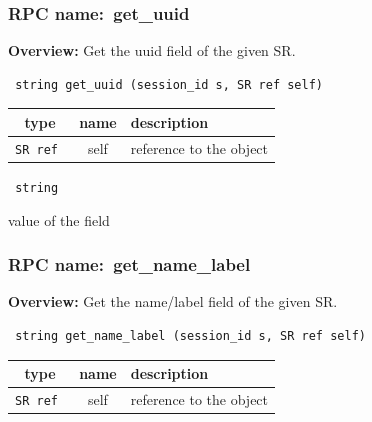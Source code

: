 \subsubsection{RPC name:~get\_uuid}

{\bf Overview:} 
Get the uuid field of the given SR.

\begin{verbatim} string get_uuid (session_id s, SR ref self)\end{verbatim}



 
\vspace{0.3cm}
\begin{tabular}{|c|c|p{7cm}|}
 \hline
{\bf type} & {\bf name} & {\bf description} \\ \hline
{\tt SR ref } & self & reference to the object \\ \hline 

\end{tabular}

\vspace{0.3cm}

{\tt 
string
}


value of the field
\vspace{0.3cm}
\vspace{0.3cm}
\vspace{0.3cm}
\subsubsection{RPC name:~get\_name\_label}

{\bf Overview:} 
Get the name/label field of the given SR.

\begin{verbatim} string get_name_label (session_id s, SR ref self)\end{verbatim}



 
\vspace{0.3cm}
\begin{tabular}{|c|c|p{7cm}|}
 \hline
{\bf type} & {\bf name} & {\bf description} \\ \hline
{\tt SR ref } & self & reference to the object \\ \hline 

\end{tabular}

\vspace{0.3cm}


